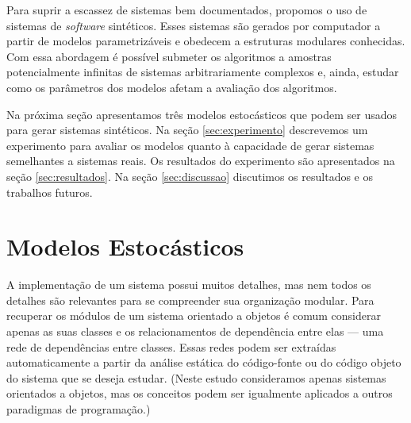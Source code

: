 \documentclass{acm_proc_article-sp}
\begin{document}

Para suprir a escassez de sistemas bem documentados, propomos o uso de sistemas de \emph{software} sintéticos. Esses sistemas são gerados por computador a partir de modelos parametrizáveis e obedecem a estruturas modulares conhecidas. Com essa abordagem é possível submeter os algoritmos a amostras potencialmente infinitas de sistemas arbitrariamente complexos e, ainda, estudar como os parâmetros dos modelos afetam a avaliação dos algoritmos. %


Na próxima seção apresentamos três modelos estocásticos que podem ser usados para gerar sistemas sintéticos. Na seção \ref{sec:experimento} descrevemos um experimento para avaliar os modelos quanto à capacidade de gerar sistemas semelhantes a sistemas reais. Os resultados do experimento são apresentados na seção \ref{sec:resultados}. Na seção \ref{sec:discussao} discutimos os resultados e os trabalhos futuros.

\section{Modelos Estocásticos} \label{sec:modelos}

A implementação de um sistema possui muitos detalhes, mas nem todos os detalhes são relevantes para se compreender sua organização modular. Para recuperar os módulos de um sistema orientado a objetos é comum considerar apenas as suas classes e os relacionamentos de dependência entre elas --- uma rede de dependências entre classes. Essas redes podem ser extraídas automaticamente a partir da análise estática do código-fonte ou do código objeto do sistema que se deseja estudar. (Neste estudo consideramos apenas sistemas orientados a objetos, mas os conceitos podem ser igualmente aplicados a outros paradigmas de programação.)
\end{document}
